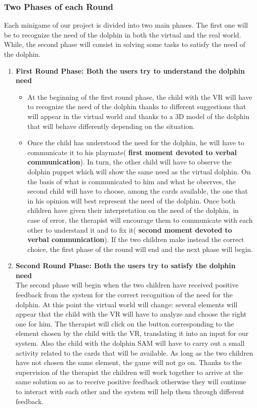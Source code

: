 \documentclass [12pt]{article}
\begin{document}
\subsubsection{Two Phases of each Round}
Each minigame of our project is divided into two main phases. 
The first one will be to recognize the need of the dolphin in both the virtual and the real world. While, the second phase  will consist in solving some tasks to satisfy the need of the dolphin.
\begin{enumerate}
\item  \textbf{First Round Phase: Both the users try to understand the dolphin need}
\begin{itemize}[•]
\item At the beginning of the first round phase, the child with the VR will have to recognize the need of the dolphin thanks to different suggestions that will appear in the virtual world and thanks to a 3D model of the dolphin that will behave differently depending on the situation.
\item Once the child has understood the need for the dolphin, he will have to communicate it to his playmate( \textbf{first moment devoted to verbal communication}). In turn, the other child will have to observe the dolphin puppet which will show the same need as the virtual dolphin. On the basis of what is communicated to him and what he observes, the second child will have to choose, among the cards available, the one that in his opinion will best represent the need of the dolphin. 
Once both children have given their interpretation on the need of the dolphin, in case of error, the therapist will encourage them to communicate with each other to understand it and to fix it( \textbf{second moment devoted to verbal communication}). If the two children make instead the correct choice, the first phase of the round will end and the next phase will begin.
\end{itemize}
\item \textbf{Second Round Phase: Both the users try to satisfy the dolphin need}\\
The second phase will begin when the two children have received positive feedback from the system for the correct recognition of the need for the dolphin. At this point the virtual world will change: several elements will appear that the child with the VR will have to analyze and choose the right one for him. The therapist will click on the button corresponding to the element chosen by the child with the VR, translating it into an input for our system. Also the child with the dolphin SAM will have to carry out a small activity related to the cards that will be available. As long as the two children have not chosen the same element, the game will not go on. Thanks to the supervision of the therapist the children will work together to arrive at the same solution so as to receive positive feedback otherwise they will continue to interact with each other and the system will help them through different feedback. 
\end{enumerate}
\end{document}
